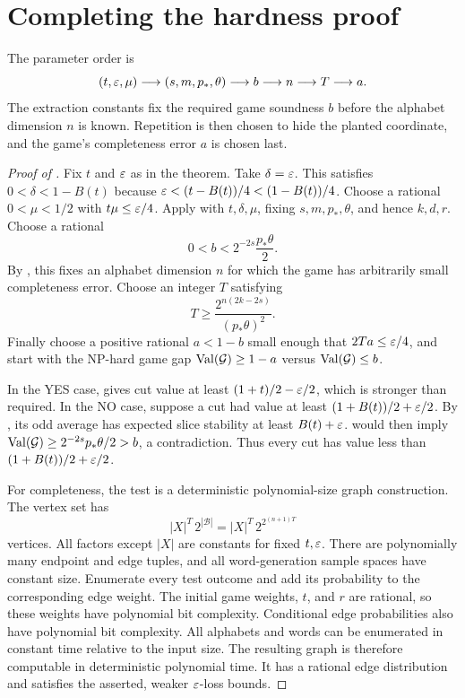 \section{Completing the hardness proof}\label{sec:completion}

The parameter order is
\[
 (t,\varepsilon,\mu)\longrightarrow(s,m,p_*,\theta)
 \longrightarrow b\longrightarrow n\longrightarrow T\longrightarrow a.
\]
The extraction constants fix the required game soundness $b$ before the
alphabet dimension $n$ is known. Repetition is then chosen to hide the
planted coordinate, and the game's completeness error $a$ is chosen last.

\begin{proof}[Proof of ]
Fix $t$ and $\varepsilon$ as in the theorem. Take $\delta=\varepsilon$. This satisfies $0<\delta<1-B(t)$ because
$\varepsilon<(t-B(t))/4<(1-B(t))/4$. Choose a
rational $0<\mu<1/2$ with $t\mu\le\varepsilon/4$.
Apply  with $t,\delta,\mu$, fixing
$s,m,p_*,\theta$, and hence $k,d,r$. Choose a rational
\[
 0<b<2^{-2s}\frac{p_*\theta}{2}.
\]
By , this fixes an alphabet dimension $n$ for
which the game has arbitrarily small completeness error. Choose an
integer $T$ satisfying
\[
 T\ge\frac{2^{n(2k-2s)}}{(p_*\theta)^2}.
\]
Finally choose a positive rational $a<1-b$ small enough that
$2Ta\le\varepsilon/4$, and start with the NP-hard game gap
$\operatorname{Val}(\mathcal G)\ge1-a$ versus $\operatorname{Val}(\mathcal G)\le b$.

In the YES case,  gives cut value at least
$(1+t)/2-\varepsilon/2$, which is stronger than required.
In the NO case, suppose a cut had value at least
$(1+B(t))/2+\varepsilon/2$. By , its odd average has
expected slice stability at least $B(t)+\varepsilon$.
 would then imply
$\operatorname{Val}(\mathcal G)\ge2^{-2s}p_*\theta/2>b$, a contradiction.
Thus every cut has value less than $(1+B(t))/2+\varepsilon/2$.

For completeness, the test is a deterministic polynomial-size graph
construction. The vertex set has
\[
 |X|^T\,2^{|\mathcal B|}
 =|X|^T\,2^{2^{(n+1)T}}
\]
vertices. All factors except $|X|$ are constants for fixed $t,\varepsilon$.
There are polynomially many endpoint and edge tuples, and all
word-generation sample spaces have constant size. Enumerate every test
outcome and add its probability to the corresponding edge weight.
The initial game weights, $t$, and $r$ are rational, so these weights
have polynomial bit complexity. Conditional edge probabilities also
have polynomial bit complexity. All alphabets and words can be enumerated
in constant time relative to the input size. The resulting graph is
therefore computable in deterministic polynomial time. It has a rational
edge distribution and satisfies the asserted, weaker $\varepsilon$-loss bounds.
\end{proof}

